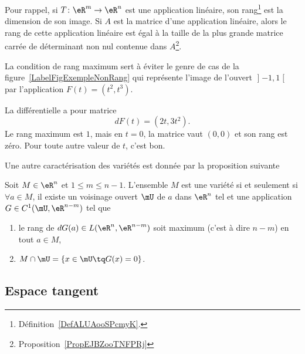 Pour rappel, si $T\colon \eR^m\to \eR^n$ est une application linéaire, son rang\footnote{Définition~\ref{DefALUAooSPcmyK}.} est la dimension de son image. Si $A$ est la matrice d'une application linéaire, alors le rang de cette application linéaire est égal à la taille de la plus grande matrice carrée de déterminant non nul contenue dans $A$\footnote{Proposition~\ref{PropEJBZooTNFPRj}}.

La condition de rang maximum sert à éviter le genre de cas de la figure~\ref{LabelFigExempleNonRang} qui représente l'image de l'ouvert $\mathopen] -1 , 1 \mathclose[$ par l'application $F(t)=(t^2,t^3)$.
\newcommand{\CaptionFigExempleNonRang}{Quelque chose qui n'est pas de rang maximum et qui n'est pas une variété.}

%
La différentielle a pour matrice
\begin{equation}
    dF(t)=(2t,3t^2).
\end{equation}
Le rang maximum est $1$, mais en $t=0$, la matrice vaut $(0,0)$ et son rang est zéro. Pour toute autre valeur de $t$, c'est bon.

Une autre caractérisation des variétés est donnée par la proposition suivante %
\begin{proposition}     \label{PropCarVarZerFonc}
    Soit $M\in \eR^n$ et $1\leq m\leq n-1$. L'ensemble $M$ est une variété si et seulement si $\forall a\in M$, il existe un voisinage ouvert $\mU$ de $a$ dans $\eR^n$ tel et une application $G\in C^1(\mU,\eR^{n-m})$ tel que
    \begin{enumerate}

        \item
            le rang de $dG(a)\in L(\eR^n,\eR^{n-m})$ soit maximum (c'est à dire $n-m$) en tout $a\in M$,
        \item
            $M\cap\mU=\{ x\in\mU\tq G(x)=0 \}$.

    \end{enumerate}
\end{proposition}

\subsection{Espace tangent}

